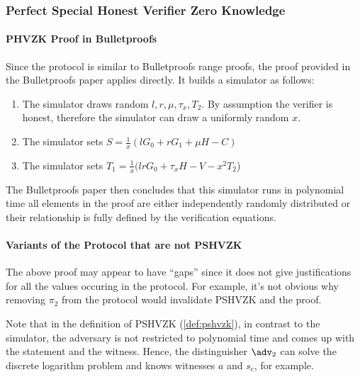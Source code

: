 \subsubsection{Perfect Special Honest Verifier Zero Knowledge}

\paragraph{PHVZK Proof in Bulletproofs}
Since the protocol is similar to Bulletproofs range proofs, the proof provided in the Bulletproofs \cite{bp1} paper applies directly.
It builds a simulator as follows:
\begin{enumerate}
  \item The simulator draws random $l, r, \mu, \tau_x, T_2$. By assumption the verifier is honest, therefore the simulator can draw a uniformly random $x$.
  \item The simulator sets $S = \frac{1}{x}(lG_0 + rG_1 + \mu H - C)$
  \item The simulator sets $T_1 = \frac{1}{x}(lrG_0 + \tau_xH - V - x^2T_2$)
\end{enumerate}
The Bulletproofs paper then concludes that this simulator runs in polynomial time all elements in the proof are either independently randomly distributed or their relationship is fully defined by the verification equations.

\paragraph{Variants of the Protocol that are not PSHVZK}
The above proof may appear to have ``gaps'' since it does not give justifications for all the values occuring in the protocol.
For example, it's not obvious why removing $\pi_2$ from the protocol would invalidate PSHVZK and the proof.

Note that in the definition of PSHVZK (\cref{def:pshvzk}), in contrast to the simulator, the adversary is not restricted to polynomial time and comes up with the statement and the witness.
Hence, the distinguisher $\adv_2$ can solve the discrete logarithm problem and knows witnesses $a$ and $s_c$, for example.

